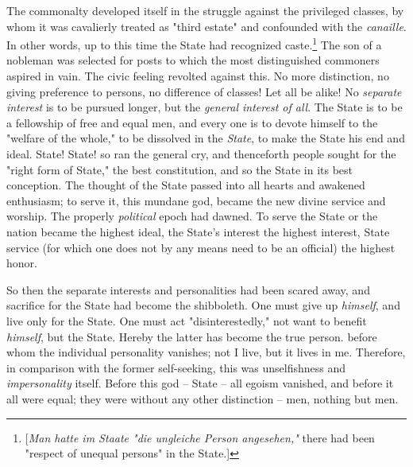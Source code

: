The commonalty developed itself in the struggle against the privileged 
classes, by whom it was cavalierly treated as "{}third estate"{} and 
confounded with the \textit{canaille}. In other words, up to this time the 
State had recognized caste.\footnote{[\textit{Man hatte im Staate "{}die 
ungleiche Person angesehen,"{}} there had been "{}respect of unequal 
persons"{} in the State.]} The son of a nobleman was selected for posts to 
which the most distinguished commoners aspired in vain. The civic feeling 
revolted against this. No more distinction, no giving preference to persons, 
no difference of classes! Let all be alike! No \textit{separate interest} is 
to be pursued longer, but the \textit{general interest of all}. The State is 
to be a fellowship of free and equal men, and every one is to devote himself 
to the "{}welfare of the whole,"{} to be dissolved in the \textit{State}, to 
make the State his end and ideal. State! State! so ran the general cry, and 
thenceforth people sought for the "{}right form of State,"{} the best 
constitution, and so the State in its best conception. The thought of the 
State passed into all hearts and awakened enthusiasm; to serve it, this 
mundane god, became the new divine service and worship. The properly 
\textit{political} epoch had dawned. To serve the State or the nation became 
the highest ideal, the State's interest the highest interest, State service 
(for which one does not by any means need to be an official) the highest 
honor.

So then the separate interests and personalities had been scared away, and 
sacrifice for the State had become the shibboleth. One must give up 
\textit{himself}, and live only for the State. One must act 
"{}disinterestedly,"{} not want to benefit \textit{himself}, but the State. 
Hereby the latter has become the true person. before whom the individual 
personality vanishes; not I live, but it lives in me. Therefore, in comparison 
with the former self-seeking, this was unselfishness and 
\textit{impersonality} itself. Before this god -- State -- all egoism 
vanished, and before it all were equal; they were without any other 
distinction -- men, nothing but men.

